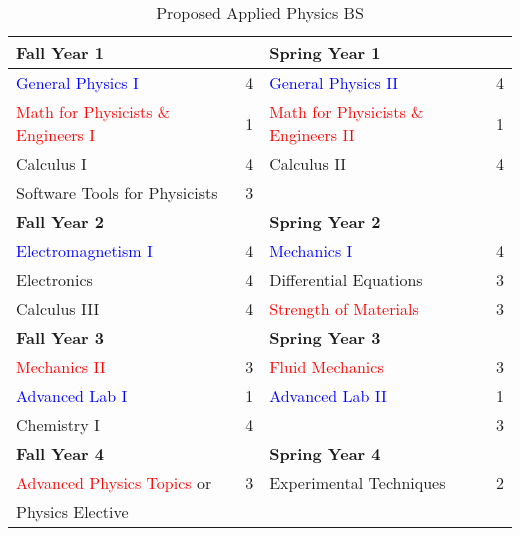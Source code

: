 \documentclass[12pt,preprint]{aastex}
\newcommand{\red}[1]{\textcolor{red}{#1}}
\newcommand{\blue}[1]{\textcolor{blue}{#1}}
\begin{document}
\begin{table}[h!]
\caption{Proposed Applied Physics BS}
\medskip
\begin{tabular}{lclc}
\hline
{\bf Fall Year 1} &  & {\bf Spring Year 1} &  \\
\hline
\hline
\blue{General Physics I}       & 4 & \blue{General Physics II} & 4 \\
\red{Math for Physicists \& Engineers I}   & 1 & \red{Math for Physicists \& Engineers II} & 1 \\
Calculus I                    & 4 & Calculus II & 4 \\
Software Tools for Physicists & 3 &   &  \\
\hline
{\bf Fall Year 2} &  & {\bf Spring Year 2} &  \\
\hline
\hline
\blue{Electromagnetism I}  & 4 & \blue{Mechanics I} & 4 \\
Electronics         & 4 & Differential Equations & 3 \\
Calculus III        & 4 & \red{Strength of Materials} & 3 \\
\hline
{\bf Fall Year 3} &  & {\bf Spring Year 3} &  \\
\hline
\hline
\red{Mechanics II}    & 3 & \red{Fluid Mechanics} & 3 \\
\blue{Advanced Lab I} & 1 & \blue{Advanced Lab II} & 1 \\
Chemistry I           & 4 &  & 3 \\
\hline
{\bf Fall Year 4} &  & {\bf Spring Year 4} &  \\
\hline
\hline
\red{Advanced Physics Topics} or & 3 & Experimental Techniques & 2 \\ 
\hspace{3mm} Physics Elective &   &  &  \\ 
\end{tabular}
\end{table}
\end{document}
